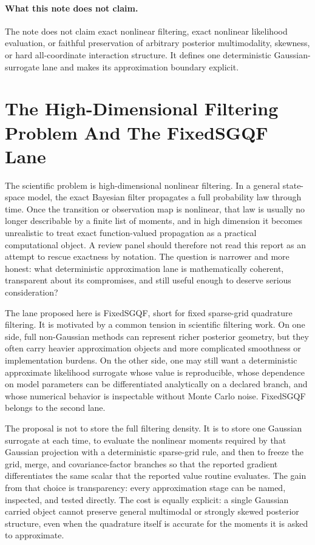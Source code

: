 \documentclass[11pt]{article}
\numberwithin{equation}{section}
\begin{document}
\paragraph{What this note does not claim.}
The note does not claim exact nonlinear filtering, exact nonlinear likelihood
evaluation, or faithful preservation of arbitrary posterior multimodality,
skewness, or hard all-coordinate interaction structure.  It defines one
deterministic Gaussian-surrogate lane and makes its approximation boundary
explicit.

\tableofcontents

\section{The High-Dimensional Filtering Problem And The FixedSGQF Lane}
\label{sec:p32-problem-lane}

The scientific problem is high-dimensional nonlinear filtering.  In a general
state-space model, the exact Bayesian filter propagates a full probability law
through time.  Once the transition or observation map is nonlinear, that law is
usually no longer describable by a finite list of moments, and in high
dimension it becomes unrealistic to treat exact function-valued propagation as a
practical computational object.  A review panel should therefore not read this
report as an attempt to rescue exactness by notation.  The question is narrower
and more honest: what deterministic approximation lane is mathematically
coherent, transparent about its compromises, and still useful enough to deserve
serious consideration?

The lane proposed here is FixedSGQF, short for fixed sparse-grid quadrature
filtering.  It is motivated by a common tension in scientific filtering work.
On one side, full non-Gaussian methods can represent richer posterior geometry,
but they often carry heavier approximation objects and more complicated
smoothness or implementation burdens.  On the other side, one may still want a
deterministic approximate likelihood surrogate whose value is reproducible, whose
dependence on model parameters can be differentiated analytically on a declared
branch, and whose numerical behavior is inspectable without Monte Carlo noise.
FixedSGQF belongs to the second lane.

The proposal is not to store the full filtering density.  It is to store one
Gaussian surrogate at each time, to evaluate the nonlinear moments required by
that Gaussian projection with a deterministic sparse-grid rule, and then to
freeze the grid, merge, and covariance-factor branches so that the reported
gradient differentiates the same scalar that the reported value routine
evaluates.  The gain from that choice is transparency: every approximation stage
can be named, inspected, and tested directly.  The cost is equally explicit: a
single Gaussian carried object cannot preserve general multimodal or strongly
skewed posterior structure, even when the quadrature itself is accurate for the
moments it is asked to approximate.
\end{document}
